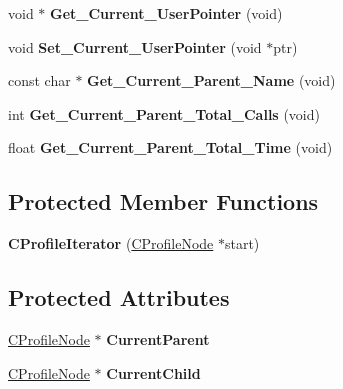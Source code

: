 \begin{DoxyCompactItemize}
\item 
\hypertarget{class_c_profile_iterator_a2dd1ce5575126c0603a8da5f729f7cde}{void $\ast$ {\bfseries Get\+\_\+\+Current\+\_\+\+User\+Pointer} (void)}\label{class_c_profile_iterator_a2dd1ce5575126c0603a8da5f729f7cde}

\item 
\hypertarget{class_c_profile_iterator_a6873a85aab7876fd40a0789eec11b59a}{void {\bfseries Set\+\_\+\+Current\+\_\+\+User\+Pointer} (void $\ast$ptr)}\label{class_c_profile_iterator_a6873a85aab7876fd40a0789eec11b59a}

\item 
\hypertarget{class_c_profile_iterator_a8f39045cfbb406ed1b9cf1f57aac460b}{const char $\ast$ {\bfseries Get\+\_\+\+Current\+\_\+\+Parent\+\_\+\+Name} (void)}\label{class_c_profile_iterator_a8f39045cfbb406ed1b9cf1f57aac460b}

\item 
\hypertarget{class_c_profile_iterator_a0d76e29528c64ef95de5e4fafd6cd711}{int {\bfseries Get\+\_\+\+Current\+\_\+\+Parent\+\_\+\+Total\+\_\+\+Calls} (void)}\label{class_c_profile_iterator_a0d76e29528c64ef95de5e4fafd6cd711}

\item 
\hypertarget{class_c_profile_iterator_a8c4aadfa90b81cf3161961f4e82dd2cc}{float {\bfseries Get\+\_\+\+Current\+\_\+\+Parent\+\_\+\+Total\+\_\+\+Time} (void)}\label{class_c_profile_iterator_a8c4aadfa90b81cf3161961f4e82dd2cc}

\end{DoxyCompactItemize}
\subsection*{Protected Member Functions}
\begin{DoxyCompactItemize}
\item 
\hypertarget{class_c_profile_iterator_aea53ee6b3b00e5b5e869625a78cc3783}{{\bfseries C\+Profile\+Iterator} (\hyperlink{class_c_profile_node}{C\+Profile\+Node} $\ast$start)}\label{class_c_profile_iterator_aea53ee6b3b00e5b5e869625a78cc3783}

\end{DoxyCompactItemize}
\subsection*{Protected Attributes}
\begin{DoxyCompactItemize}
\item 
\hypertarget{class_c_profile_iterator_abe530f6f5170e87c770685d3ac6c4871}{\hyperlink{class_c_profile_node}{C\+Profile\+Node} $\ast$ {\bfseries Current\+Parent}}\label{class_c_profile_iterator_abe530f6f5170e87c770685d3ac6c4871}

\item 
\hypertarget{class_c_profile_iterator_a49edf4f5b35c2ab18a9afd9a94f30507}{\hyperlink{class_c_profile_node}{C\+Profile\+Node} $\ast$ {\bfseries Current\+Child}}\label{class_c_profile_iterator_a49edf4f5b35c2ab18a9afd9a94f30507}

\end{DoxyCompactItemize}
